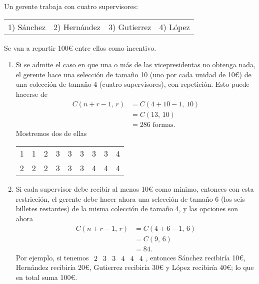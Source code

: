 \begin{myexample}
    Un gerente trabaja con cuatro supervisores:
    \begin{center}
        \begin{tabular}{cccc}
            1) Sánchez & 2) Hernández & 3) Gutierrez & 4) López
        \end{tabular}
    \end{center}
    Se van a repartir 100€ entre ellos como incentivo.
    \begin{enumerate}[label=\alph*)]
        \item Si se admite el caso en que una o más de las vicepresidentas no obtenga nada, el gerente hace una selección de tamaño 10 (uno por cada unidad de 10€) de una colección de tamaño 4 (cuatro supervisores), con repetición. Esto puede hacerse de
        \begin{align*}
            C(n + r - 1, \, r) & = C(4 + 10 - 1, \, 10) \\
            & = C(13, \, 10) \\
            & = 286 \text{ formas.}
        \end{align*}
        Mostremos dos de ellas
        \begin{center}
            \begin{tabular}{ccccccccc}
                1 & 1 & 2 & 3 & 3 & 3 & 3 & 3 & 4 \\
                2 & 2 & 2 & 3 & 3 & 3 & 4 & 4 & 4
            \end{tabular}
        \end{center}
        \item Si cada supervisor debe recibir al menos 10€ como mínimo, entonces con esta restricción, el gerente debe hacer ahora una selección de tamaño 6 (los seis billetes restantes) de la misma colección de tamaño 4, y las opciones son ahora
        \begin{align*}
            C(n + r - 1, \, r) & = C(4 + 6 - 1, \, 6) \\
            & = C(9, \, 6) \\
            & = 84.
        \end{align*}
        Por ejemplo, si tenemos $\begin{array}{cccccc}
            2 & 3 & 3 & 4 & 4 & 4
        \end{array}$\!\!, entonces Sánchez recibiría 10€, Hernández recibiría 20€, Gutierrez recibiría 30€ y López recibiría 40€; lo que en total suma 100€.
    \end{enumerate}
\end{myexample}

